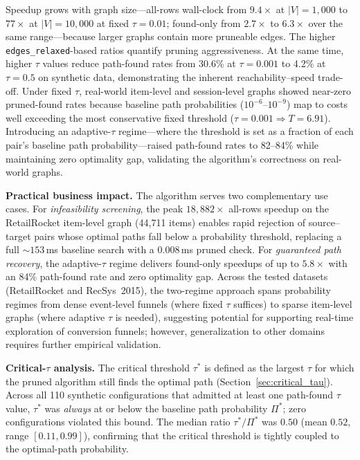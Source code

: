 Speedup grows with graph size---all-rows wall-clock from $9.4\times$ at $|V|=1{,}000$ to $77\times$ at $|V|=10{,}000$ at fixed $\tau=0.01$; found-only from $2.7\times$ to $6.3\times$ over the same range---because larger graphs contain more pruneable edges. The higher \texttt{edges\_relaxed}-based ratios quantify pruning aggressiveness. At the same time, higher $\tau$ values reduce path-found rates from 30.6\% at $\tau=0.001$ to 4.2\% at $\tau=0.5$ on synthetic data, demonstrating the inherent reachability--speed trade-off. Under fixed $\tau$, real-world item-level and session-level graphs showed near-zero pruned-found rates because baseline path probabilities ($10^{-6}$--$10^{-9}$) map to costs well exceeding the most conservative fixed threshold ($\tau=0.001 \Rightarrow T=6.91$). Introducing an adaptive-$\tau$ regime---where the threshold is set as a fraction of each pair's baseline path probability---raised path-found rates to 82--84\% while maintaining zero optimality gap, validating the algorithm's correctness on real-world graphs.

\textbf{Practical business impact.} The algorithm serves two complementary use cases. For \emph{infeasibility screening}, the peak $18{,}882\times$ all-rows speedup on the RetailRocket item-level graph (44,711 items) enables rapid rejection of source--target pairs whose optimal paths fall below a probability threshold, replacing a full ${\sim}153$\,ms baseline search with a $0.008$\,ms pruned check. For \emph{guaranteed path recovery}, the adaptive-$\tau$ regime delivers found-only speedups of up to $5.8\times$ with an 84\% path-found rate and zero optimality gap. Across the tested datasets (RetailRocket and RecSys~2015), the two-regime approach spans probability regimes from dense event-level funnels (where fixed $\tau$ suffices) to sparse item-level graphs (where adaptive $\tau$ is needed), suggesting potential for supporting real-time exploration of conversion funnels; however, generalization to other domains requires further empirical validation.

\textbf{Critical-$\tau$ analysis.}
The critical threshold $\tau^*$ is defined as the largest $\tau$ for which the pruned algorithm still finds the optimal path (Section~\ref{sec:critical_tau}). Across all 110 synthetic configurations that admitted at least one path-found $\tau$ value, $\tau^*$ was \emph{always} at or below the baseline path probability $\Pi^*$; zero configurations violated this bound. The median ratio $\tau^*/\Pi^*$ was $0.50$ (mean $0.52$, range $[0.11, 0.99]$), confirming that the critical threshold is tightly coupled to the optimal-path probability.

